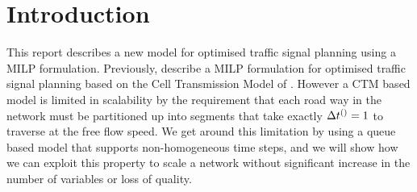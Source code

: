 \section{Introduction}
This report describes a new model for optimised traffic signal planning using a MILP formulation. Previously,  describe a MILP formulation for optimised traffic signal planning based on the Cell Transmission Model of . However a CTM based model is limited in scalability by the requirement that each road way in the network must be partitioned up into segments that take exactly $\DT[]=1$ to traverse at the free flow speed. We get around this limitation by using a queue based model that supports non-homogeneous time steps, and we will show how we can exploit this property to scale a network without significant increase in the number of variables or loss of quality.
